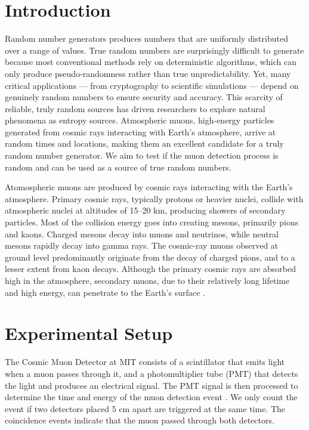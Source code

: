 \section{Introduction}
Random number generators produces numbers that are uniformly distributed over a range of values. True random numbers are surprisingly difficult to generate because most conventional methods rely on deterministic algorithms, which can only produce pseudo-randomness rather than true unpredictability. Yet, many critical applications — from cryptography to scientific simulations — depend on genuinely random numbers to ensure security and accuracy. This scarcity of reliable, truly random sources has driven researchers to explore natural phenomena as entropy sources. Atmospheric muons, high-energy particles generated from cosmic rays interacting with Earth's atmosphere, arrive at random times and locations, making them an excellent candidate for a truly random number generator. We aim to test if the muon detection process is random and can be used as a source of true random numbers. 

Atomospheric muons are produced by cosmic rays interacting with the Earth's atmosphere. Primary cosmic rays, typically protons or heavier nuclei, collide with atmospheric nuclei at altitudes of 15--20 km, producing showers of secondary particles. Most of the collision energy goes into creating mesons, primarily pions and kaons. Charged mesons decay into muons and neutrinos, while neutral mesons rapidly decay into gamma rays. The cosmic-ray muons observed at ground level predominantly originate from the decay of charged pions, and to a lesser extent from kaon decays. Although the primary cosmic rays are absorbed high in the atmosphere, secondary muons, due to their relatively long lifetime and high energy, can penetrate to the Earth's surface \cite{axani2024cosmicwatch}.

\section{Experimental Setup}
The Cosmic Muon Detector at MIT consists of a scintillator that emits light when a muon passes through it, and a photomultiplier tube (PMT) that detects the light and produces an electrical signal. The PMT signal is then processed to determine the time and energy of the muon detection event \cite{axani2024cosmicwatch}. We only count the event if two detectors placed 5 cm apart are triggered at the same time. The coincidence events indicate that the muon passed through both detectors. 

